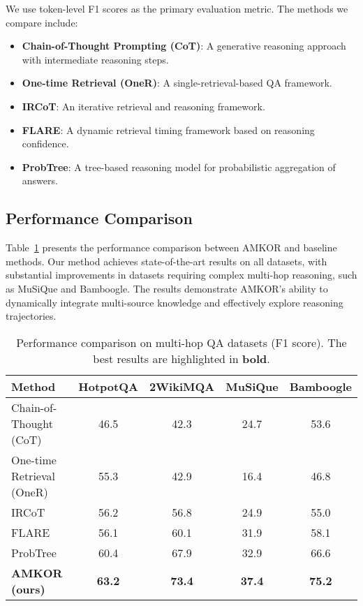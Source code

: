 We use token-level F1 scores as the primary evaluation metric. The methods we compare include:
\begin{itemize}
    \item \textbf{Chain-of-Thought Prompting (CoT)}: A generative reasoning approach with intermediate reasoning steps.
    \item \textbf{One-time Retrieval (OneR)}: A single-retrieval-based QA framework.
    \item \textbf{IRCoT}: An iterative retrieval and reasoning framework.
    \item \textbf{FLARE}: A dynamic retrieval timing framework based on reasoning confidence.
    \item \textbf{ProbTree}: A tree-based reasoning model for probabilistic aggregation of answers.
\end{itemize}

\subsection{Performance Comparison}

Table~\ref{tab:main_results} presents the performance comparison between AMKOR and baseline methods. Our method achieves state-of-the-art results on all datasets, with substantial improvements in datasets requiring complex multi-hop reasoning, such as MuSiQue and Bamboogle. The results demonstrate AMKOR's ability to dynamically integrate multi-source knowledge and effectively explore reasoning trajectories.

\begin{table}[ht]
\centering
\caption{Performance comparison on multi-hop QA datasets (F1 score). The best results are highlighted in \textbf{bold}.}
\label{tab:main_results}
\begin{tabular}{lcccc}
\toprule
\textbf{Method} & \textbf{HotpotQA} & \textbf{2WikiMQA} & \textbf{MuSiQue} & \textbf{Bamboogle} \\
\midrule
Chain-of-Thought (CoT) & 46.5 & 42.3 & 24.7 & 53.6 \\
One-time Retrieval (OneR) & 55.3 & 42.9 & 16.4 & 46.8 \\
IRCoT & 56.2 & 56.8 & 24.9 & 55.0 \\
FLARE & 56.1 & 60.1 & 31.9 & 58.1 \\
ProbTree & 60.4 & 67.9 & 32.9 & 66.6 \\
\textbf{AMKOR (ours)} & \textbf{63.2} & \textbf{73.4} & \textbf{37.4} & \textbf{75.2} \\
\bottomrule
\end{tabular}
\end{table}

